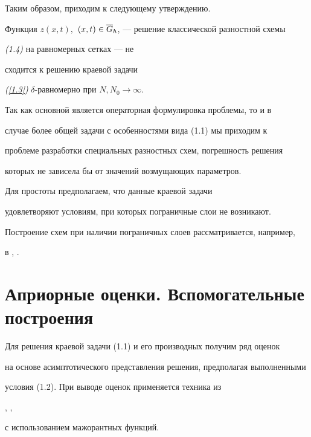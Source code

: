 Таким образом, приходим к следующему утверждению.





\begin{thmm} \label{th0}


Функция $z(x,t),$ $(x,t)\in\overline{G}_h$, --- решение классической разностной схемы


{\em (1.4)} на равномерных сетках --- не


сходится к решению краевой задачи 


{\em (\ref{1.3})} $\delta$-равномерно при $N, N_0\to \infty$.


\end{thmm}





Так как основной является операторная формулировка проблемы, то и в 


случае более общей задачи с особенностями вида (1.1) мы приходим к


проблеме разработки специальных разностных схем, погрешность решения


которых не зависела бы от значений возмущающих параметров.





Для простоты предполагаем, что данные краевой задачи 


удовлетворяют условиям, при которых пограничные слои не возникают. 


Построение схем при наличии пограничных слоев рассматривается, например,


в \cite{Sh1}, \cite{Sh4}.


 


\section {Априорные оценки. Вспомогательные построения}





Для решения краевой задачи (1.1) и его производных получим ряд оценок 


на основе асимптотического представления решения, предполагая выполненными


условия (1.2). При выводе оценок применяется техника из


\cite{Sh1}, \cite{Sh4}, \cite{Sh5} 


с использованием мажорантных функций.





